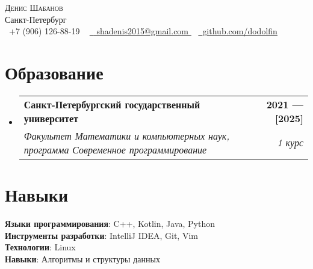 \documentclass[a4,12pt]{article}
\makeatletter
\newcommand{\resumeSubheading}[4]{
  \vspace{-2pt}\item
    \begin{tabular*}{1.0\textwidth}[t]{l@{\extracolsep{\fill}}r}
      \textbf{#1} & \textbf{\small #2} \\
      \textit{\small#3} & \textit{\small #4} \\
    \end{tabular*}\vspace{-7pt}
}
\newcommand{\resumeSubHeadingListStart}{\begin{itemize}[leftmargin=0.0in, label={}]}
\newcommand{\resumeSubHeadingListEnd}{\end{itemize}}
\makeatother
\begin{document}

\begin{center}
    {\Huge \scshape Денис Шабанов} \\ \vspace{1pt}
    Санкт-Петербург \\ \vspace{1pt}
    \small \raisebox{-0.1\height}\faPhone\ 
    +7 (906) 126-88-19 ~
    \href{
    mailto:shadenis2015@gmail.com
    }{\raisebox{-0.2\height}\faEnvelope\  \underline{
    shadenis2015@gmail.com
    }} ~ 
    \href{https://github.com/dodolfin}{\raisebox{-0.2\height}\faGithub\ \underline{github.com/dodolfin}}
    \vspace{-8pt}
\end{center}


\section{Образование}
  \resumeSubHeadingListStart
    \resumeSubheading
      {Санкт-Петербургский государственный университет}{2021 — [2025]}
      {Факультет Математики и компьютерных наук, программа Современное программирование}{1 курс}
  \resumeSubHeadingListEnd
  
\section{Навыки}
 \begin{itemize}[leftmargin=0.15in, label={}]
    \small{\item{
     \textbf{Языки программирования}{: C++, Kotlin, Java, Python} \\
     \textbf{Инструменты разработки}{: IntelliJ IDEA, Git, Vim } \\
     \textbf{Технологии}{: Linux} \\
     \textbf{Навыки}{: Алгоритмы и структуры данных}
    }}
 \end{itemize}
 \vspace{-16pt}
\end{document}
